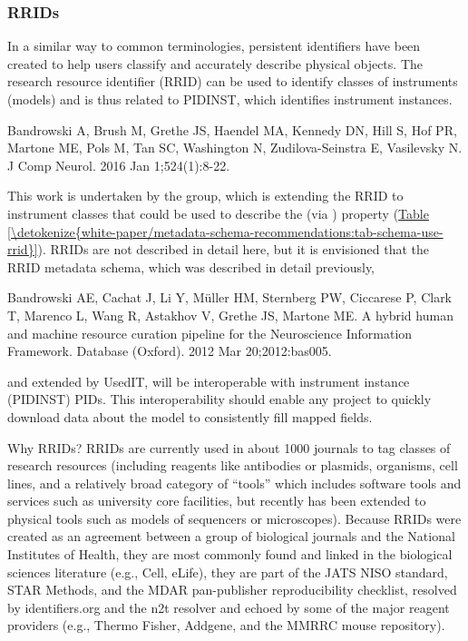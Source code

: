 \documentclass[a4paper,10pt,english]{sphinxmanual}
\begin{document}
\subsubsection{RRIDs}
\label{\detokenize{white-paper/metadata-schema-recommendations:rrids}}
In a similar way to common terminologies, persistent identifiers have
been created to help users classify and accurately describe physical
objects.  The research resource identifier (RRID) can be used to identify
classes of instruments (models) and is thus related to PIDINST, which
identifies instrument instances.%
\begin{footnote}[1]\sphinxAtStartFootnote
Bandrowski A, Brush M, Grethe JS, Haendel MA, Kennedy DN, Hill S, Hof
PR, Martone ME, Pols M, Tan SC, Washington N, Zudilova-Seinstra E,
Vasilevsky N.  J
Comp Neurol. 2016 Jan 1;524(1):8-22.
%
\end{footnote} This work is undertaken
by the  group, which is extending the RRID to instrument classes
that could be used to describe the  (via ) property
(\hyperref[\detokenize{white-paper/metadata-schema-recommendations:tab-schema-use-rrid}]{Table \ref{\detokenize{white-paper/metadata-schema-recommendations:tab-schema-use-rrid}}}).  RRIDs are not described in detail
here, but it is envisioned that the RRID metadata schema, which was
described in detail previously,%
\begin{footnote}[2]\sphinxAtStartFootnote
Bandrowski AE, Cachat J, Li Y, Müller HM, Sternberg PW, Ciccarese P,
Clark T, Marenco L, Wang R, Astakhov V, Grethe JS, Martone ME. A
hybrid human and machine resource curation pipeline for the
Neuroscience Information Framework. Database (Oxford). 2012 Mar
20;2012:bas005. 
%
\end{footnote} and extended by
UsedIT, will be interoperable with instrument instance (PIDINST) PIDs.
This interoperability should enable any project to quickly download
data about the model to consistently fill mapped fields.

Why RRIDs? RRIDs are currently used in about 1000 journals to tag
classes of research resources (including reagents like antibodies or
plasmids, organisms, cell lines, and a relatively broad category of
“tools” which includes software tools and services such as university
core facilities, but recently has been extended to physical tools such
as models of sequencers or microscopes). Because RRIDs were created as
an agreement between a group of biological journals and the National
Institutes of Health, they are most commonly found and linked in the
biological sciences literature (e.g., Cell, eLife), they are part of the
JATS NISO standard, STAR Methods, and the MDAR pan-publisher
reproducibility checklist, resolved by identifiers.org and the n2t
resolver and echoed by some of the major reagent providers (e.g., Thermo
Fisher, Addgene, and the MMRRC mouse repository).
\end{document}
